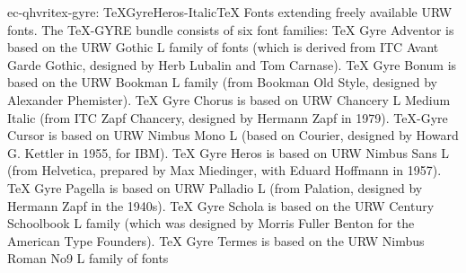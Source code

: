 \documentclass{ddltxtyp}
\begin{document}
\begin{package}{ec-qhvri}{tex-gyre: TeXGyreHeros-Italic}{{\TeX} Fonts extending freely available URW fonts.}
The {\TeX}-GYRE bundle consists of six font families: {\TeX} Gyre
Adventor is based on the URW Gothic L family of fonts (which is
derived from ITC Avant Garde Gothic, designed by Herb Lubalin
and Tom Carnase). {\TeX} Gyre Bonum is based on the URW Bookman L
family (from Bookman Old Style, designed by Alexander
Phemister). {\TeX} Gyre Chorus is based on URW Chancery L Medium
Italic (from ITC Zapf Chancery, designed by Hermann Zapf in
1979). {\TeX}-Gyre Cursor is based on URW Nimbus Mono L (based on
Courier, designed by Howard G. Kettler in 1955, for IBM). {\TeX}
Gyre Heros is based on URW Nimbus Sans L (from Helvetica,
prepared by Max Miedinger, with Eduard Hoffmann in 1957). {\TeX}
Gyre Pagella is based on URW Palladio L (from Palation,
designed by Hermann Zapf in the 1940s). {\TeX} Gyre Schola is
based on the URW Century Schoolbook L family (which was
designed by Morris Fuller Benton for the American Type
Founders). {\TeX} Gyre Termes is based on the URW Nimbus Roman No9
L family of fonts %
\end{package}
\end{document}
